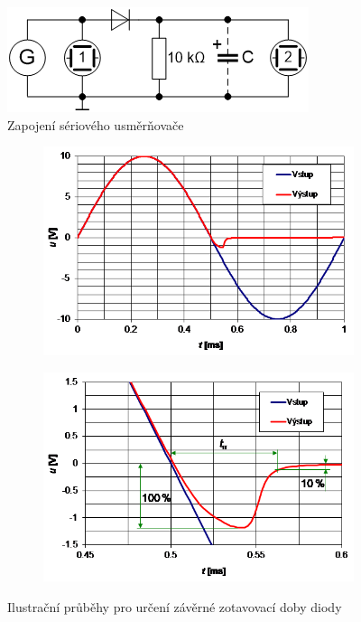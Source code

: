 \documentclass[a4paper, czech]{article}
\begin{document}
\begin{figure}[H]
    \centering
    \includegraphics{obr1.png}
    \caption{Zapojení sériového usměrňovače}
\end{figure}
\begin{figure}[H]
    \centering
    \begin{subfigure}[b]{0.49\textwidth}
        \centering
        \includegraphics[width=\textwidth]{obr2-1.png}
    \end{subfigure}
    \begin{subfigure}[b]{0.49\textwidth}
        \centering
        \includegraphics[width=\textwidth]{obr2-2.png}
    \end{subfigure}
    \caption{Ilustrační průběhy pro určení závěrné zotavovací doby diody}
\end{figure}
\end{document}
